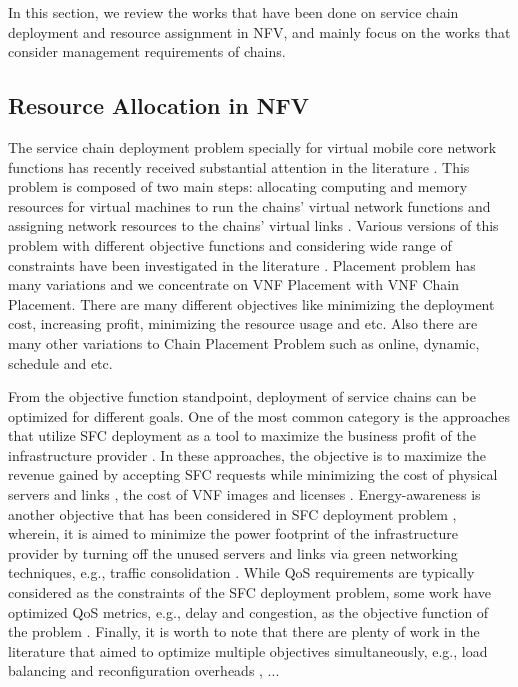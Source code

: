 In this section, we review the works that have been done on service chain deployment and resource assignment in NFV, and mainly focus on the works that consider management requirements of chains.

\subsection{Resource Allocation in NFV}
The service chain deployment problem specially for virtual mobile core network functions has recently received substantial attention in the literature \cite{GilHerrera2016}\cite{Laghrissi2019}\cite{Bhamare2016}.
This problem is composed of two main steps: allocating computing and memory resources for virtual machines to run the chains' virtual network functions and assigning network resources to the chains' virtual links \cite{Laghrissi2019}. 
Various versions of this problem with different objective functions and considering wide range of constraints have been investigated in the literature \cite{Laghrissi2019}.
Placement problem has many variations and we concentrate on VNF Placement with VNF Chain Placement. There are many different objectives
like minimizing the deployment cost, increasing profit, minimizing the resource usage and etc. \cite{Laghrissi2019}\cite{Bhamare2016}
Also there are many other variations to Chain Placement Problem such as online, dynamic, schedule and etc. \cite{1608.00095}

From the objective function standpoint, deployment of service chains can be optimized for different goals.
One of the most common category is the approaches that utilize SFC deployment as a tool to maximize the business profit of the infrastructure provider \cite{Eramo2016}\cite{Eramo2017}\cite{TahmasbiNejad2018}\cite{Huang2019}.
In these approaches, the objective is to maximize the revenue gained by accepting SFC requests while minimizing the cost of physical servers and links \cite{Bouet2015}\cite{Pham2020}\cite{Huang2019}, the cost of VNF images and licenses \cite{Bouet2015}.
Energy-awareness is another objective that has been considered in SFC deployment problem \cite{Eramo2017}\cite{Eramo20172}\cite{Farkiani2019},
wherein, it is aimed to minimize the power footprint of the infrastructure provider by turning off the unused servers and links via green networking techniques, e.g., traffic consolidation \cite{Zheng2020}.
While QoS requirements are typically considered as the constraints of the SFC deployment problem, some work have optimized QoS metrics, e.g., delay and congestion, as the objective function of the problem  \cite{Huang2019}\cite{Yu2017}\cite{Chen2017}.
Finally, it is worth to note that there are plenty of work in the literature that aimed to optimize multiple objectives simultaneously, e.g., load balancing and reconfiguration overheads \cite{Qu2020}, ...

